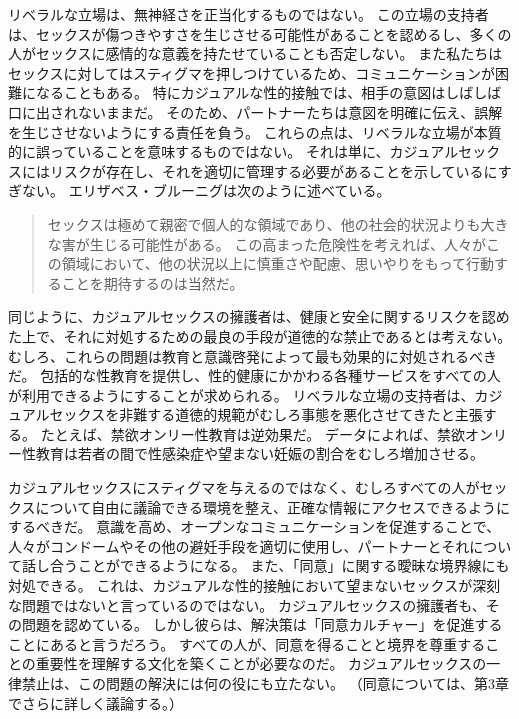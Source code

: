 \documentclass[paper=a4,book,openany]{jlreq}
\begin{document}
リベラルな立場は、無神経さを正当化するものではない。
この立場の支持者は、セックスが傷つきやすさを生じさせる可能性があることを認めるし、多くの人がセックスに感情的な意義を持たせていることも否定しない。
また私たちはセックスに対してはスティグマを押しつけているため、コミュニケーションが困難になることもある。
特にカジュアルな性的接触では、相手の意図はしばしば口に出されないままだ。
そのため、パートナーたちは意図を明確に伝え、誤解を生じさせないようにする責任を負う。
これらの点は、リベラルな立場が本質的に誤っていることを意味するものではない。
それは単に、カジュアルセックスにはリスクが存在し、それを適切に管理する必要があることを示しているにすぎない。
エリザベス・ブルーニグは次のように述べている。

\begin{quote}
  セックスは極めて親密で個人的な領域であり、他の社会的状況よりも大きな害が生じる可能性がある。
この高まった危険性を考えれば、人々がこの領域において、他の状況以上に慎重さや配慮、思いやりをもって行動することを期待するのは当然だ。
\citep{bruenig18:_aziz_ansar_debac}

\end{quote}

同じように、カジュアルセックスの擁護者は、健康と安全に関するリスクを認めた上で、それに対処するための最良の手段が道徳的な禁止であるとは考えない。
むしろ、これらの問題は教育と意識啓発によって最も効果的に対処されるべきだ。
包括的な性教育を提供し、性的健康にかかわる各種サービスをすべての人が利用できるようにすることが求められる。
リベラルな立場の支持者は、カジュアルセックスを非難する道徳的規範がむしろ事態を悪化させてきたと主張する。
たとえば、禁欲オンリー性教育は逆効果だ。
データによれば、禁欲オンリー性教育は若者の間で性感染症や望まない妊娠の割合をむしろ増加させる。

カジュアルセックスにスティグマを与えるのではなく、むしろすべての人がセックスについて自由に議論できる環境を整え、正確な情報にアクセスできるようにするべきだ。
意識を高め、オープンなコミュニケーションを促進することで、人々がコンドームやその他の避妊手段を適切に使用し、パートナーとそれについて話し合うことができるようになる。
また、「同意」に関する曖昧な境界線にも対処できる。
これは、カジュアルな性的接触において望まないセックスが深刻な問題ではないと言っているのではない。
カジュアルセックスの擁護者も、その問題を認めている。
しかし彼らは、解決策は「同意カルチャー」を促進することにあると言うだろう。
すべての人が、同意を得ることと境界を尊重することの重要性を理解する文化を築くことが必要なのだ。
カジュアルセックスの一律禁止は、この問題の解決には何の役にも立たない。
（同意については、第3章でさらに詳しく議論する。）
\end{document}
